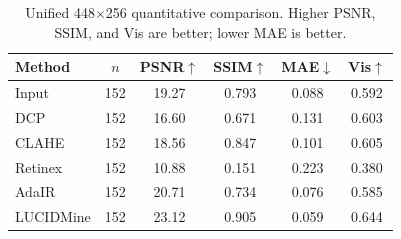 \begin{table}[t]
\centering
\caption{Unified 448$\times$256 quantitative comparison. Higher PSNR, SSIM, and Vis are better; lower MAE is better.}
\label{tab:arc_chart_data_summary}
\begin{tabular}{lccccc}
\toprule
Method & $n$ & PSNR$\uparrow$ & SSIM$\uparrow$ & MAE$\downarrow$ & Vis$\uparrow$ \\
\midrule
Input & 152 & 19.27 & 0.793 & 0.088 & 0.592 \\
DCP & 152 & 16.60 & 0.671 & 0.131 & 0.603 \\
CLAHE & 152 & 18.56 & 0.847 & 0.101 & 0.605 \\
Retinex & 152 & 10.88 & 0.151 & 0.223 & 0.380 \\
AdaIR & 152 & 20.71 & 0.734 & 0.076 & 0.585 \\
LUCIDMine & 152 & 23.12 & 0.905 & 0.059 & 0.644 \\
\bottomrule
\end{tabular}
\end{table}
